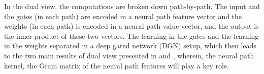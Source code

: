 In the dual view, the computations are broken down path-by-path. The input and the gates (in each path) are encoded in a neural path feature vector and the weights (in each path) is encoded in a neural path value vector, and the output is the inner product of these two vectors.  %
The learning in the gates and the learning in the weights separated in a deep gated network (DGN) setup, which then leads to the two main results of dual view presented in  and , wherein, the neural path kernel, the Gram matrix of the neural path features will play a key role. %

